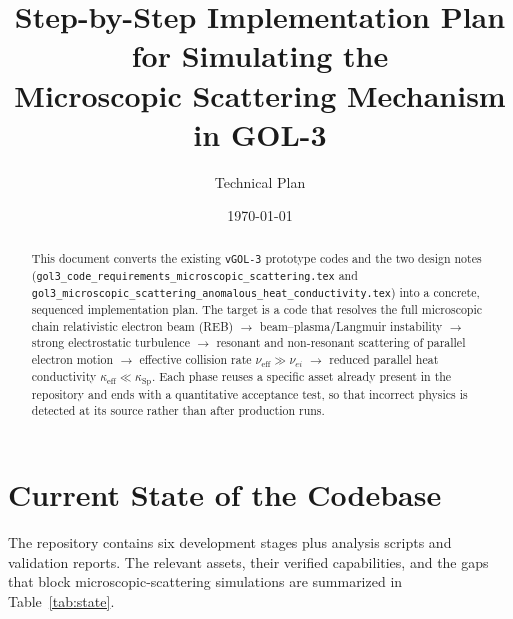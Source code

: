 \documentclass[11pt,a4paper]{article}
\title{Step-by-Step Implementation Plan for Simulating the\\
Microscopic Scattering Mechanism in GOL-3}
\author{Technical Plan}
\date{\today}
\begin{document}
\maketitle

\begin{abstract}
This document converts the existing \texttt{vGOL-3} prototype codes and the two design notes
(\texttt{gol3\_code\_requirements\_microscopic\_scattering.tex} and
\texttt{gol3\_microscopic\_scattering\_anomalous\_heat\_conductivity.tex}) into a concrete,
sequenced implementation plan. The target is a code that resolves the full microscopic chain
relativistic electron beam (REB) $\rightarrow$ beam--plasma/Langmuir instability $\rightarrow$
strong electrostatic turbulence $\rightarrow$ resonant and non-resonant scattering of parallel
electron motion $\rightarrow$ effective collision rate $\nu_{\mathrm{eff}} \gg \nu_{ei}$
$\rightarrow$ reduced parallel heat conductivity $\kappa_{\mathrm{eff}} \ll \kappa_{\mathrm{Sp}}$.
Each phase reuses a specific asset already present in the repository and ends with a quantitative
acceptance test, so that incorrect physics is detected at its source rather than after production
runs.
\end{abstract}

\tableofcontents
\newpage

\section{Current State of the Codebase}

The repository contains six development stages plus analysis scripts and validation reports. The
relevant assets, their verified capabilities, and the gaps that block microscopic-scattering
simulations are summarized in Table~\ref{tab:state}.
\end{document}

